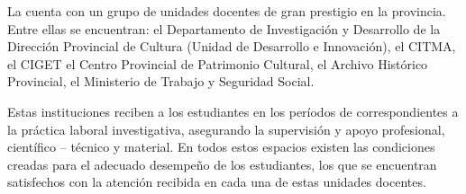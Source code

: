 La cuenta con un grupo de unidades docentes de gran prestigio en la provincia. Entre ellas se encuentran: el Departamento de Investigación y Desarrollo de la Dirección Provincial de Cultura (Unidad de Desarrollo e Innovación), el CITMA, el CIGET el Centro Provincial de Patrimonio Cultural, el Archivo Histórico Provincial, el Ministerio de Trabajo y Seguridad Social.

Estas instituciones reciben a los estudiantes en los períodos de correspondientes a la práctica laboral investigativa, asegurando la supervisión y apoyo profesional, científico – técnico y material. En todos estos espacios existen las condiciones creadas para el adecuado desempeño de los estudiantes, los que se encuentran satisfechos con la atención recibida en cada una de estas unidades docentes.